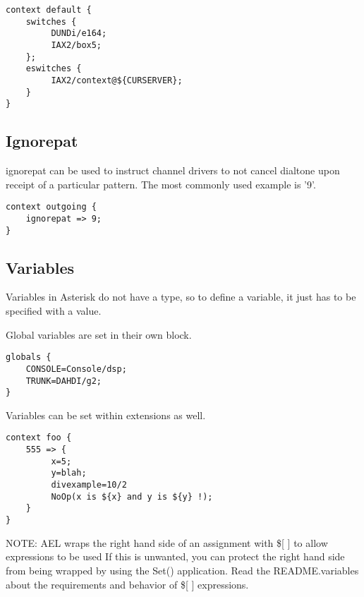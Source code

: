{\begin{astlisting}
\begin{verbatim}
context default {
    switches {
         DUNDi/e164;
         IAX2/box5;
    };
    eswitches {
         IAX2/context@${CURSERVER};
    }
}
\end{verbatim}
\end{astlisting}

\subsection{Ignorepat}

ignorepat can be used to instruct channel drivers to not cancel
dialtone upon receipt of a particular pattern. The most commonly used
example is '9'.
\begin{astlisting}
\begin{verbatim}
context outgoing {
    ignorepat => 9;
}
\end{verbatim}
\end{astlisting}

\subsection{Variables}

Variables in Asterisk do not have a type, so to define a variable, it
just has to be specified with a value.

Global variables are set in their own block.

\begin{astlisting}
\begin{verbatim}
globals {
    CONSOLE=Console/dsp;
    TRUNK=DAHDI/g2;
}
\end{verbatim}
\end{astlisting}

Variables can be set within extensions as well.

\begin{astlisting}
\begin{verbatim}
context foo {
    555 => {
         x=5;
         y=blah;
         divexample=10/2
         NoOp(x is ${x} and y is ${y} !);
    }
}
\end{verbatim}
\end{astlisting}

NOTE: AEL wraps the right hand side of an assignment with \$[ ] to allow
expressions to be used If this is unwanted, you can protect the right hand
side from being wrapped by using the Set() application.
Read the README.variables about the requirements and behavior
of \$[ ] expressions.

}
